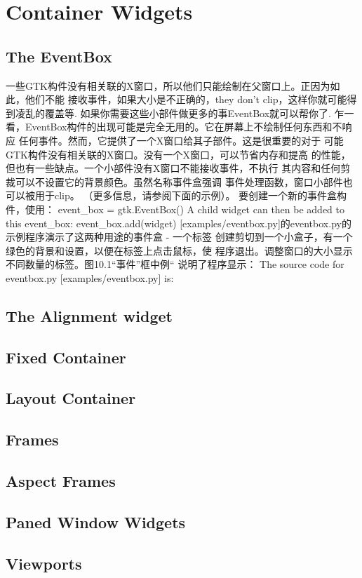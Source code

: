 \chapter{Container Widgets}
\section{The EventBox}
一些GTK构件没有相关联的X窗口，所以他们只能绘制在父窗口上。正因为如此，他们不能
接收事件，如果大小是不正确的，they don't clip，这样你就可能得到凌乱的覆盖等.
如果你需要这些小部件做更多的事EventBox就可以帮你了.
乍一看，EventBox构件的出现可能是完全无用的。它在屏幕上不绘制任何东西和不响应
任何事件。然而，它提供了一个X窗口给其子部件。这是很重要的对于
可能GTK构件没有相关联的X窗口。没有一个X窗口，可以节省内存和提高
的性能，但也有一些缺点。一个小部件没有X窗口不能接收事件，不执行
其内容和任何剪裁可以不设置它的背景颜色。虽然名称事件盒强调
事件处理函数，窗口小部件也可以被用于clip。 （更多信息，请参阅下面的示例）。
要创建一个新的事件盒构件，使用：
event_box = gtk.EventBox()
A child widget can then be added to this event_box:
event_box.add(widget)
[examples/eventbox.py]的eventbox.py的示例程序演示了这两种用途的事件盒 - 一个标签
创建剪切到一个小盒子，有一个绿色的背景和设置，以便在标签上点击鼠标，使
程序退出。调整窗口的大小显示不同数量的标签。图10.1“事件”框中例“
说明了程序显示：	
The source code for eventbox.py [examples/eventbox.py] is:
\section{The Alignment widget}
\section{Fixed Container}
\section{Layout Container}
\section{Frames}
\section{Aspect Frames}
\section{Paned Window Widgets}
\section{Viewports}
